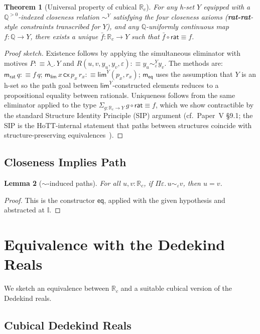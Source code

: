 \documentclass[12pt]{article}
\newtheorem{theorem}{Theorem}[section]
\newtheorem{lemma}[theorem]{Lemma}
\theoremstyle{definition}
\theoremstyle{remark}
\newcommand{\Q}{\mathbb{Q}}
\newcommand{\Rc}{\mathbb{R}_{c}}
\newcommand{\rat}{\mathsf{rat}}
\newcommand{\hlim}{\mathsf{lim}}
\newcommand{\II}{\mathbb{I}}
\newcommand{\close}{\mathrel{\sim}}
\begin{document}
\begin{theorem}[Universal property of cubical $\Rc$]
\label{thm:Rc-univ}
For any h-set $Y$ equipped with a $\Q^{>0}$-indexed closeness relation
$\close^Y$ satisfying the four closeness axioms (\textbf{rat-rat}-style
constraints transcribed for $Y$), and any
$\Q$-uniformly continuous map $f : \Q \to Y$, there exists a unique
$\bar f : \Rc \to Y$ such that $\bar f \circ \rat \equiv f$.
\end{theorem}
\begin{proof}[Proof sketch]
Existence follows by applying the simultaneous eliminator with motives
$P :\equiv \lambda \_.\, Y$ and
$R(u, v, y_u, y_v, \varepsilon) :\equiv y_u \close^Y_\varepsilon y_v$.
The methods are: $\mathsf{m_{rat}}\,q :\equiv f\,q$;
$\mathsf{m_{lim}}\,x\,\mathsf{cx}\,p_x\,r_x :\equiv \hlim^Y(p_x, r_x)$;
$\mathsf{m_{eq}}$ uses the assumption that $Y$ is an h-set so the path
goal between $\hlim^Y$-constructed elements reduces to a propositional
equality between rationals.
Uniqueness follows from the same eliminator applied to the type
$\Sigma_{g : \Rc \to Y}\, g \circ \rat \equiv f$, which we show
contractible by the standard Structure Identity Principle (SIP)
argument (cf.\ Paper~V \S 9.1; the SIP is the HoTT-internal statement
that paths between structures coincide with structure-preserving
equivalences~\cite[\S 9.8]{HoTTBook}).
\end{proof}

\subsection{Closeness Implies Path}

\begin{lemma}[$\close$-induced paths]
\label{lem:close-path}
For all $u, v : \Rc$, if $\Pi\varepsilon.\, u \close_\varepsilon v$,
then $u = v$.
\end{lemma}
\begin{proof}
This is the constructor $\mathsf{eq}$, applied with the given hypothesis
and abstracted at $\II$.
\end{proof}

\section{Equivalence with the Dedekind Reals}
\label{sec:dedekind}

We sketch an equivalence between $\Rc$ and a suitable cubical version of
the Dedekind reals.

\subsection{Cubical Dedekind Reals}
\end{document}
